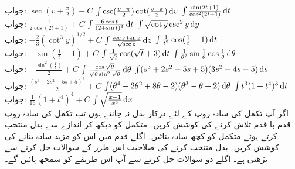 جواب:\quad
$\sec(v+\tfrac{\pi}{2})+C$
$\int\csc(\tfrac{v-\pi}{2})\cot(\tfrac{v-\pi}{2})\dif v$
$\int\tfrac{\sin(2t+1)}{\cos^2(2t+1)}\dif t$\\
جواب:\quad
$\tfrac{1}{2\cos(2t+1)}+C$
$\int\tfrac{6\cos t}{(2+\sin t)^3}\dif t$
$\int\sqrt{\cot y}\csc^2 y\dif y$\\
جواب:\quad
$-\tfrac{2}{3}(\cot^3y)^{1/2}+C$
$\int\tfrac{\sec z\tan z}{\sqrt{\sec z}}\dif z$
$\int \tfrac{1}{t^2}\cos(\tfrac{1}{t}-1)\dif t$\\
جواب:\quad
$-\sin(\tfrac{1}{t}-1)+C$
$\int\tfrac{1}{\sqrt{t}}\cos(\sqrt{t}+3)\dif t$
$\int\tfrac{1}{\theta^2}\sin\tfrac{1}{\theta}\cos\tfrac{1}{\theta}\dif\theta$\\
جواب:\quad
$-\tfrac{\sin^2(\tfrac{1}{\theta})}{2}+C$
$\int\tfrac{\cos\sqrt{\theta}}{\sqrt{\theta}\sin^2\sqrt{\theta}}\dif\theta$
$\int(s^3+2s^2-5s+5)(3s^2+4s-5)\dif s$\\
جواب:\quad
$\tfrac{(s^3+2s^2-5s+5)^2}{2}+C$
$\int(\theta^4-2\theta^2+8\theta-2)(\theta^3-\theta+2)\dif\theta$
$\int t^3(1+t^4)^3\dif t$\\
جواب:\quad
$\tfrac{1}{16}(1+t^4)^4+C$
$\int\sqrt{\tfrac{x-1}{x^5}}\dif x$
\\
اگر آپ تکمل کی سادہ روپ کے لئے درکار بدل نہ جانتے ہوں تب تکمل کی سادہ روپ قدم با قدم تلاش کرنے کی کوشش کریں۔ متکمل کو دیکھ کر اندازے سے بدل منتخب کرتے ہوئے متکمل کو کچھ سادہ بنائیں۔ اگلے قدم میں اس کو مزید سادہ بنانے کی کوشش کریں۔ بدل منتخب کرنے کی صلاحیت اس طرز کے سوالات حل کرنے سے بڑھتی ہے۔ اگلے دو سوالات حل کرنے سے آپ اس طریقے کو سمجھ پائیں گے۔ 

